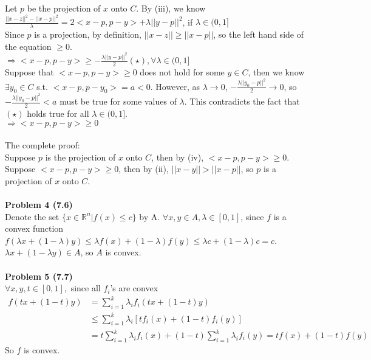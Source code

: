 \documentclass[letterpaper,12pt]{article}
\theoremstyle{definition}
\begin{document}
Let $p$ be the projection of $x$ onto $C$. By (iii), we know\\
$\frac{||x-z||^2-||x-p||^2}{\lambda} = 2<x-p, p-y>+\lambda||y-p||^2$, if $\lambda \in (0, 1]$\\
Since $p$ is a projection, by definition, $||x-z||\geq ||x-p||$, so the left hand side of the equation $\geq 0$.\\
$\Rightarrow <x-p, p-y> \geq -\frac{\lambda||y-p||^2}{2}(\star), \forall \lambda\in (0, 1]$\\
Suppose that $<x-p, p-y>\geq 0$ does not hold for some $y\in C$, then we know $\exists y_0\in C$ s.t. $<x-p, p-y_0> = a<0$. However, as $\lambda\rightarrow 0$, $-\frac{\lambda||y_0-p||^2}{2}\rightarrow 0$, so $-\frac{\lambda||y_0-p||^2}{2}<a$ must be true for some values of $\lambda$. This contradicts the fact that $(\star)$ holds true for all $\lambda \in (0,1]$.  \\
$\Rightarrow <x-p, p-y>\geq 0$\\
\\
The complete proof:\\
Suppose $p$ is the projection of $x$ onto $C$, then by (iv), $<x-p, p-y>\geq 0$.\\
Suppose $<x-p, p-y>\geq 0$, then by (ii), $||x-y||>||x-p||$, so $p$ is a projection of $x$ onto $C$.\\
\\
\noindent\textbf{Problem 4 (7.6)} \\
Denote the set $\{x\in \mathbb{R}^n|f(x)\leq c\}$ by A. $\forall x, y\in A, \lambda\in [0, 1]$, since $f$ is a convex function\\
$f(\lambda x + (1-\lambda) y)\leq \lambda f(x) + (1-\lambda)f(y) \leq \lambda c + (1-\lambda)c = c$.\\
$\lambda x + (1-\lambda y)\in A$, so $A$ is convex.\\
\\
\noindent\textbf{Problem 5 (7.7)} \\
$\forall x, y, t\in [0,1],$ since all $f_i$'s are convex\\
\begin{align*}
f(tx + (1-t)y) &= \sum_{i=1}^k \lambda_if_i(tx+(1-t)y)\\
&\leq \sum_{i=1}^k \lambda_i[tf_i(x) + (1-t)f_i(y)]\\
&= t\sum_{i=1}^k \lambda_i f_i(x)+(1-t)\sum_{i=1}^k \lambda_if_i(y) = tf(x)+(1-t)f(y)
\end{align*}
So $f$ is convex.\\
\\
\end{document}
